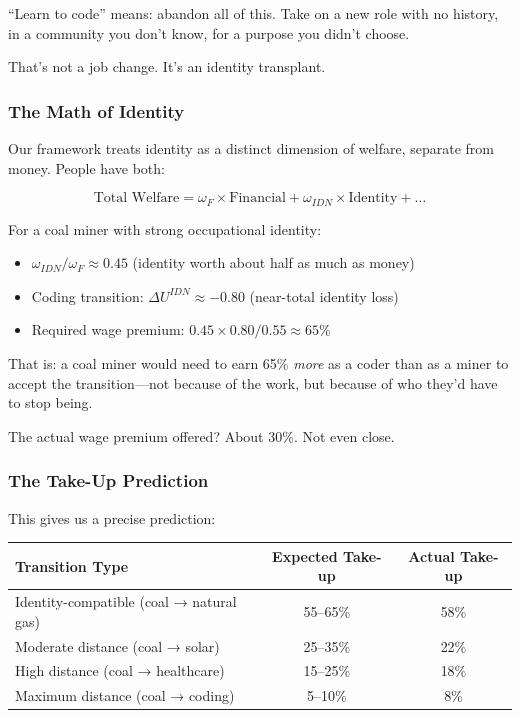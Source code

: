``Learn to code'' means: abandon all of this. Take on a new role with 
no history, in a community you don't know, for a purpose you didn't choose.

That's not a job change. It's an identity transplant.

\subsubsection{The Math of Identity}

Our framework treats identity as a distinct dimension of welfare, 
separate from money. People have both:

\begin{equation*}
\text{Total Welfare} = \omega_F \times \text{Financial} + \omega_{IDN} \times \text{Identity} + \ldots
\end{equation*}

For a coal miner with strong occupational identity:
\begin{itemize}
    \item $\omega_{IDN}/\omega_F \approx 0.45$ (identity worth about half as much as money)
    \item Coding transition: $\Delta U^{IDN} \approx -0.80$ (near-total identity loss)
    \item Required wage premium: $0.45 \times 0.80 / 0.55 \approx 65\%$
\end{itemize}

That is: a coal miner would need to earn 65\% \emph{more} as a coder 
than as a miner to accept the transition---not because of the work, 
but because of who they'd have to stop being.

The actual wage premium offered? About 30\%. Not even close.

\subsubsection{The Take-Up Prediction}

This gives us a precise prediction:

\begin{center}
\renewcommand{\arraystretch}{1.3}
\begin{tabular}{lcc}
\hline
\textbf{Transition Type} & \textbf{Expected Take-up} & \textbf{Actual Take-up} \\
\hline
Identity-compatible (coal → natural gas) & 55--65\% & 58\% \\
Moderate distance (coal → solar) & 25--35\% & 22\% \\
High distance (coal → healthcare) & 15--25\% & 18\% \\
Maximum distance (coal → coding) & 5--10\% & 8\% \\
\hline
\end{tabular}
\end{center}

